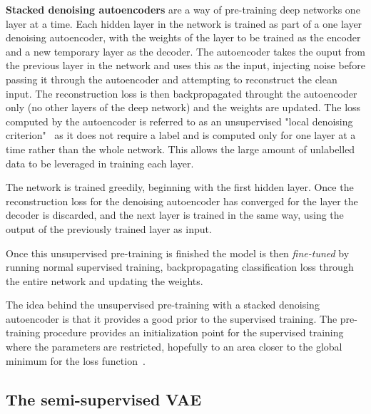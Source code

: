 \documentclass[12pt,a4paper,twoside,openright]{report}
\begin{document}
\textbf{Stacked denoising autoencoders} are a way of pre-training deep networks one layer at a time. Each hidden layer in the network is 
trained as part of a one layer denoising autoencoder, with the weights of the layer to be trained as the encoder and a new temporary layer
as the decoder. The autoencoder takes the ouput from the previous layer in the network and uses this as the input, injecting noise before 
passing it through the autoencoder and attempting to reconstruct the clean input. The reconstruction loss is then backpropagated throught 
the autoencoder only (no other layers of the deep network) and the weights are updated. The loss computed by the autoencoder is referred to 
as an unsupervised  "local denoising criterion"~\cite{Vincent:2010:SDA:1756006.1953039} as it does not require a label and is computed only 
for one layer at a time rather than the whole network. This allows the large amount of unlabelled data to be leveraged in training each layer.

The network is trained greedily, beginning with the first hidden layer. Once the reconstruction loss for the denoising autoencoder has 
converged for the layer the decoder is discarded, and the next layer is trained in the same way, using the output of the previously trained
layer as input.

Once this unsupervised pre-training is finished the model is then \textit{fine-tuned} by running normal supervised training, backpropagating
classification loss through the entire network and updating the weights.

The idea behind the unsupervised pre-training with a stacked denoising autoencoder is that it provides a good prior to the supervised training.
The pre-training procedure provides an initialization point for the supervised training where the parameters are restricted, hopefully to an area 
closer to the global minimum for the loss function~\cite{Erhan:2010:WUP:1756006.1756025}.

\subsection{The semi-supervised VAE} \label{ssVAE}
\end{document}
